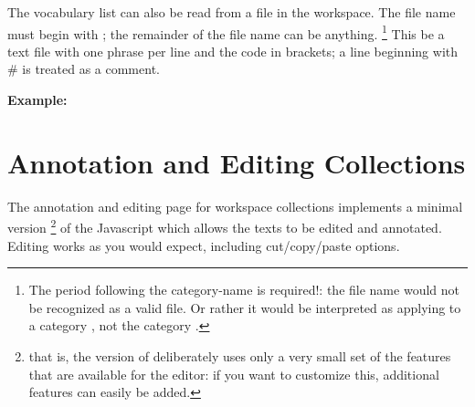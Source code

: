 \documentclass[letterpaper,10pt,english]{sphinxmanual}
\begin{document}
The vocabulary list can also be read from a file in the workspace. The
file name must begin with ; the remainder of
the file name can be anything. \footnote{
The period following the category-name is required!: the file name
 would not be recognized as a valid
 file. Or rather it would be interpreted as applying to a
category , not the category .
} This be a text file with one phrase
per line and the code in brackets; a line beginning with \# is treated as
a comment.

\textbf{Example:}
\begin{quote}




\end{quote}


\chapter{Annotation and Editing Collections}
\label{annotation::doc}\label{annotation:annotation-and-editing-collections}
The annotation and editing page for workspace collections implements a
minimal version \footnote{
that is, the version of  deliberately uses only a very
small set of the features that are available for the editor: if you
want to customize this, additional features can easily be added.
} of the Javascript  which allows the
texts to be edited and annotated. Editing works as you would expect,
including cut/copy/paste options.
\end{document}
